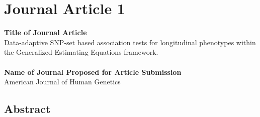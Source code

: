 \documentclass[12pt]{article}
\begin{document}
\section{Journal Article 1}\label{JA_1}
\textbf{Title of Journal Article}\\
Data-adaptive SNP-set based association tests for longitudinal phenotypes within the Generalized Estimating Equations framework.\\\\

\textbf{Name of Journal Proposed for Article Submission}\\
American Journal of Human Genetics

\newpage

\subsection*{Abstract}
\end{document}
